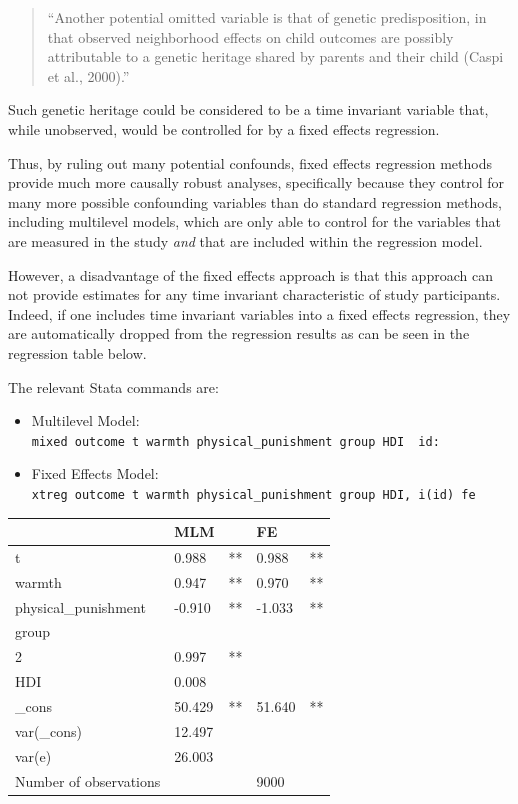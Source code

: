 \documentclass[
  letterpaper,
  DIV=11,
  numbers=noendperiod]{scrreprt}
\providecommand{\tightlist}{%
  \setlength{\itemsep}{0pt}\setlength{\parskip}{0pt}}\usepackage{longtable,booktabs,array}
\begin{document}
\begin{quote}
``Another potential omitted variable is that of genetic predisposition,
in that observed neighborhood effects on child outcomes are possibly
attributable to a genetic heritage shared by parents and their child
(Caspi et al., 2000).''
\end{quote}

Such genetic heritage could be considered to be a time invariant
variable that, while unobserved, would be controlled for by a fixed
effects regression.

Thus, by ruling out many potential confounds, fixed effects regression
methods provide much more causally robust analyses, specifically because
they control for many more possible confounding variables than do
standard regression methods, including multilevel models, which are only
able to control for the variables that are measured in the study
\emph{and} that are included within the regression model.

However, a disadvantage of the fixed effects approach is that this
approach can not provide estimates for any time invariant characteristic
of study participants. Indeed, if one includes time invariant variables
into a fixed effects regression, they are automatically dropped from the
regression results as can be seen in the regression table below.

The relevant Stata commands are:

\begin{itemize}
\tightlist
\item
  Multilevel Model:
  \texttt{mixed\ outcome\ t\ warmth\ physical\_punishment\ group\ HDI\ \textbar{}\textbar{}\ id:}
\item
  Fixed Effects Model:
  \texttt{xtreg\ outcome\ t\ warmth\ physical\_punishment\ group\ HDI,\ i(id)\ fe}
\end{itemize}

\begin{longtable}[]{@{}lllll@{}}
\toprule\noalign{}
& MLM & & FE & \\
\midrule\noalign{}
\endhead
\bottomrule\noalign{}
\endlastfoot
t & 0.988 & ** & 0.988 & ** \\
warmth & 0.947 & ** & 0.970 & ** \\
physical\_punishment & -0.910 & ** & -1.033 & ** \\
group & & & & \\
2 & 0.997 & ** & & \\
HDI & 0.008 & & & \\
\_cons & 50.429 & ** & 51.640 & ** \\
var(\_cons) & 12.497 & & & \\
var(e) & 26.003 & & & \\
Number of observations & & & 9000 & \\
\end{longtable}
\end{document}
